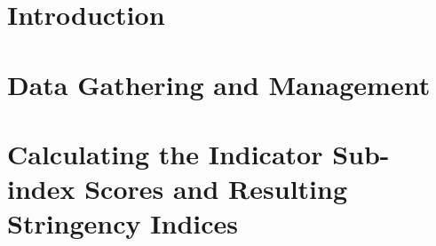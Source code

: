 \documentclass[11pt, a4paper, leqno]{article}
\begin{document}
\tableofcontents
\clearpage


\listoftables
\clearpage


\section*{Introduction} %
\label{sec:introduction}













\section{Data Gathering and Management} %
\label{sec:section1}




\section{Calculating the Indicator Sub-index Scores and Resulting Stringency Indices} %
\label{sec:section2}



\end{document}
